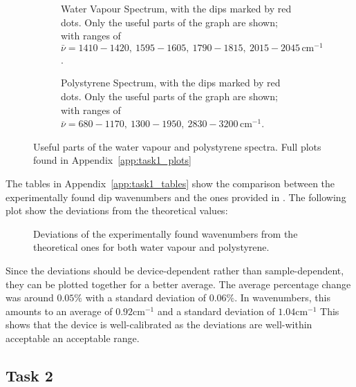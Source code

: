 \documentclass{article}
\begin{document}
\begin{figure}[h]
    \centering
    \begin{subfigure}[t]{0.48\textwidth}
        \centering
        \scalebox{0.5}{}
        \caption{Water Vapour Spectrum, with the dips marked by red dots. Only the useful parts of the graph are shown; with ranges of $\bar{\nu} = 1410-1420, \ 1595-1605, \ 1790-1815,\ 2015-2045 \, \text{cm}^{-1}$.}
        \label{fig:water_vapour}
    \end{subfigure} \hfill
    \begin{subfigure}[t]{0.48\textwidth}
        \centering
        \scalebox{0.5}{}
        \caption{Polystyrene Spectrum, with the dips marked by red dots. Only the useful parts of the graph are shown; with ranges of $\bar{\nu} = 680-1170, \ 1300-1950, \ 2830-3200 \, \text{cm}^{-1}$.}
        \label{fig:polystyrene}
    \end{subfigure}
	\caption{Useful parts of the water vapour and polystyrene spectra. Full plots found in Appendix~\ref{app:task1_plots}}
	\label{fig:water_polystyrene}
\end{figure}

The tables in Appendix~\ref{app:task1_tables} show the comparison between the experimentally found dip wavenumbers and the ones provided in \cite{riede_rotationvibration}. The following plot show the deviations from the theoretical values:

\begin{figure}[h]
	\centering
	
	\caption{Deviations of the experimentally found wavenumbers from the theoretical ones for both water vapour and polystyrene.}
	\label{fig:deviations}
\end{figure}

Since the deviations should be device-dependent rather than sample-dependent, they can be plotted together for a better average. The average percentage change was around $0.05\%$ with a standard deviation of $0.06\%$. In wavenumbers, this amounts to an average of $0.92 \text{cm}^{-1}$ and a standard deviation of $1.04 \text{cm}^{-1}$  This shows that the device is well-calibrated as the deviations are well-within acceptable an acceptable range.

\pagebreak{}

\subsection{Task 2}
\end{document}
